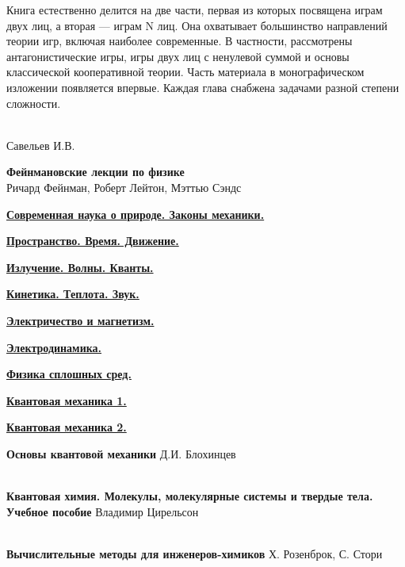 \begin{thebibliography}{99}
Книга естественно делится на две части, первая из которых посвящена играм двух
лиц, а вторая — играм N лиц. Она охватывает большинство направлений теории игр,
включая наиболее современные. В частности, рассмотрены антагонистические игры,
игры двух лиц с ненулевой суммой и основы классической кооперативной теории.
Часть материала в монографическом изложении появляется впервые. Каждая глава
снабжена задачами разной степени сложности.


 \\
Савельев И.В.

\textbf{Фейнмановские лекции по физике}\\
Ричард Фейнман, Роберт Лейтон, Мэттью Сэндс

\href{https://drive.google.com/file/d/0B0u4WeMjO894SG9RdUtzZWVhQ1E/view?usp=sharing}{\textbf{Современная
наука о природе. Законы механики.}}

\href{https://drive.google.com/file/d/0B0u4WeMjO894NjRqckpvM19hQVE/view?usp=sharing}{\textbf{Пространство. Время. Движение.}}

 \href{}{\textbf{Излучение. Волны. Кванты.}}

 \href{}{\textbf{Кинетика. Теплота. Звук.}}

\href{https://drive.google.com/file/d/0B0u4WeMjO894dGdvM19ZUTh0UGM/view?usp=sharing}{\textbf{Электричество и магнетизм.}}

 \href{}{\textbf{Электродинамика.}}

 \href{}{\textbf{Физика сплошных сред.}}

 \href{}{\textbf{Квантовая механика 1.}}

 \href{}{\textbf{Квантовая механика 2.}}

\textbf{Основы квантовой механики}
Д.И. Блохинцев


\ \\
\textbf{Квантовая химия. Молекулы, молекулярные системы и твердые тела. Учебное
пособие}
Владимир Цирельсон

\ \\
\textbf{Вычислительные методы для инженеров-химиков}
Х. Розенброк, С. Стори


\end{thebibliography}
